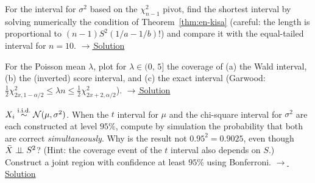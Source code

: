\documentclass[main.tex]{subfiles}
\begin{document}
\begin{exercise}\label{exr:16-2}
For the interval for $\sigma^2$ based on the $\chi^2_{n-1}$ pivot, find the shortest interval by solving numerically the condition of Theorem~\ref{thm:en-kisa} (careful: the length is proportional to $(n-1)S^2(1/a-1/b)$!) and compare it with the equal-tailed interval for $n=10$.
\hfill\hyperref[coz:16-2]{\footnotesize$\rightarrow$\,Solution}
\end{exercise}

\begin{exercise}\label{exr:16-3}
For the Poisson mean $\lambda$, plot for $\lambda\in(0,\,5]$ the coverage of (a) the Wald interval, (b) the (inverted) score interval, and (c) the exact interval (Garwood: $\frac12\chi^2_{2x,1-\alpha/2}\le\lambda n\le\frac12\chi^2_{2x+2,\alpha/2}$).
\hfill\hyperref[coz:16-3]{\footnotesize$\rightarrow$\,Solution}
\end{exercise}

\begin{exercise}\label{exr:16-4}
$X_i\overset{\text{i.i.d.}}{\sim}\mathcal{N}(\mu,\sigma^2)$. When the $t$ interval for $\mu$ and the chi-square interval for $\sigma^2$ are each constructed at level $95\%$, compute by simulation the probability that both are correct \emph{simultaneously}. Why is the result not $0.95^2=0.9025$, even though $\bar X\perp\!\!\!\perp S^2$? (Hint: the coverage event of the $t$ interval also depends on $S$.) Construct a joint region with confidence at least $95\%$ using Bonferroni.
\hfill\hyperref[coz:16-4]{\footnotesize$\rightarrow$\,Solution}
\end{exercise}

\end{document}
